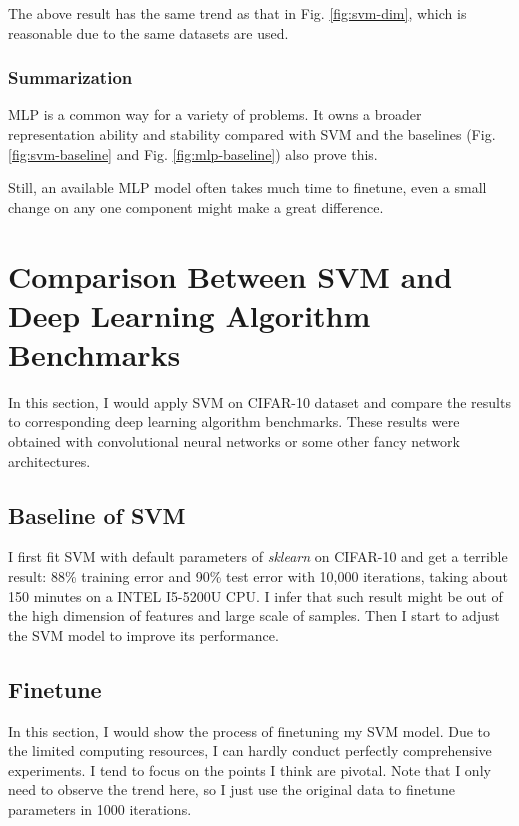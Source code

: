 \documentclass[12pt,a4paper]{article}
\theoremstyle{definition}
\begin{document}
The above result has the same trend as that in Fig. \ref{fig:svm-dim}, which is reasonable due to the same datasets are used.

\subsubsection{Summarization}
\label{sec:sum-mlp}

MLP is a common way for a variety of problems. It owns a broader representation ability and stability compared with SVM and the baselines (Fig. \ref{fig:svm-baseline} and Fig. \ref{fig:mlp-baseline}) also prove this.

\vspace{0.01\linewidth}
Still, an available MLP model often takes much time to finetune, even a small change on any one component might make a great difference.

\section{Comparison Between SVM and Deep Learning Algorithm Benchmarks}

In this section, I would apply SVM on CIFAR-10 dataset \cite{cifar-10} and compare the results to corresponding deep learning algorithm benchmarks. These results were obtained with convolutional neural networks or some other fancy network architectures.

\subsection{Baseline of SVM}
\vspace{0.01\linewidth}

I first fit SVM with default parameters of \textit{sklearn} on CIFAR-10 and get a terrible result: 88\% training error and 90\% test error with 10,000 iterations, taking about 150 minutes on a INTEL I5-5200U CPU. I infer that such result might be out of the high dimension of features and large scale of samples. Then I start to adjust the SVM model to improve its performance.

\subsection{Finetune}
\label{sec:finetune}

In this section, I would show the process of finetuning my SVM model. Due to the limited computing resources, I can hardly conduct perfectly comprehensive experiments. I tend to focus on the points I think are pivotal. Note that I only need to observe the trend here, so I just use the original data to finetune parameters in 1000 iterations.
\end{document}
